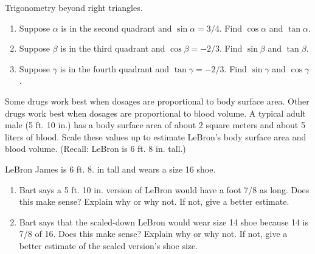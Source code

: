 \begin{prob}
Trigonometry beyond right triangles.  
\begin{enumerate}
\item Suppose $\alpha$ is in the second quadrant and $\sin\alpha = 3/4$.  Find $\cos\alpha$ and $\tan\alpha$.
\item Suppose $\beta$ is in the third quadrant and $\cos\beta = -2/3$.  Find $\sin\beta$ and $\tan\beta$.
\item Suppose $\gamma$ is in the fourth quadrant and $\tan\gamma = -2/3$.  Find $\sin\gamma$ and $\cos\gamma$.
\end{enumerate}
\end{prob}


\begin{prob}
Some drugs work best when dosages are proportional to body surface area.  Other drugs work best when dosages are proportional to blood volume.  A typical adult male (5 ft. 10 in.)  has a body surface area of about 2 square meters and about 5 liters of blood.  Scale these values up to estimate LeBron's body surface area and blood volume.  (Recall: LeBron is 6 ft. 8 in. tall.)
\end{prob}

\begin{prob}
LeBron James is 6 ft. 8. in tall and wears a size 16 shoe.  
\begin{enumerate}
\item Bart says a 5 ft. 10 in. version of LeBron would have a foot 7/8 as long.  Does this make sense?  Explain why or why not.  If not, give a better estimate.  
\item Bart says that the scaled-down LeBron would wear size 14 shoe because 14 is 7/8 of 16.  Does this make sense?  Explain why or why not.  If not, give a better estimate of the scaled version's shoe size.  
\end{enumerate}
\end{prob}

